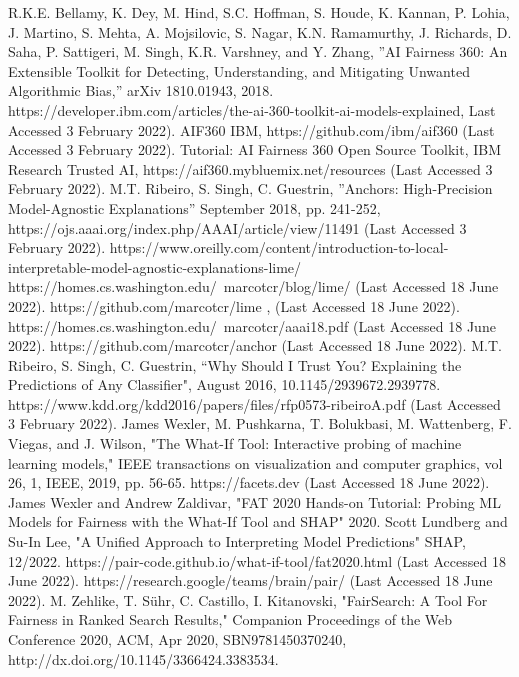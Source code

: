 \documentclass[conference]{IEEEtran}
\begin{document}
\begin{thebibliography}{00}
 R.K.E. Bellamy, K. Dey, M. Hind, S.C. Hoffman, S. Houde, K. Kannan, P. Lohia, J. Martino, S. Mehta, A. Mojsilovic, S. Nagar, K.N. Ramamurthy, J. Richards, D. Saha, P. Sattigeri, M. Singh, K.R. Varshney, and Y. Zhang, ''AI Fairness 360: An Extensible Toolkit for Detecting, Understanding, and Mitigating Unwanted Algorithmic Bias,'' arXiv 1810.01943, 2018.
 https://developer.ibm.com/articles/the-ai-360-toolkit-ai-models-explained, Last Accessed 3 February 2022).
 AIF360 IBM, https://github.com/ibm/aif360 (Last Accessed 3 February 2022).
 Tutorial: AI Fairness 360 Open Source Toolkit, IBM Research Trusted AI, https://aif360.mybluemix.net/resources (Last Accessed 3 February 2022).
 M.T. Ribeiro, S. Singh, C. Guestrin, ''Anchors: High-Precision Model-Agnostic Explanations'' September 2018, pp. 241-252, https://ojs.aaai.org/index.php/AAAI/article/view/11491 (Last Accessed 3 February 2022).
 https://www.oreilly.com/content/introduction-to-local-interpretable-model-agnostic-explanations-lime/
 https://homes.cs.washington.edu/~marcotcr/blog/lime/ (Last Accessed 18 June 2022).
 https://github.com/marcotcr/lime , (Last Accessed 18 June 2022).
 https://homes.cs.washington.edu/~marcotcr/aaai18.pdf (Last Accessed 18 June 2022).
 https://github.com/marcotcr/anchor (Last Accessed 18 June 2022).
 M.T. Ribeiro, S. Singh, C. Guestrin, “Why Should I Trust You? Explaining the Predictions of Any Classifier", August 2016, 10.1145/2939672.2939778.
 https://www.kdd.org/kdd2016/papers/files/rfp0573-ribeiroA.pdf (Last Accessed 3 February 2022).
 James Wexler, M. Pushkarna, T. Bolukbasi, M. Wattenberg, F. Viegas, and J. Wilson, "The What-If Tool: Interactive probing of machine learning models," IEEE transactions on visualization and computer graphics, vol 26, 1, IEEE, 2019, pp. 56-65.
 https://facets.dev (Last Accessed 18 June 2022).
 James Wexler and Andrew Zaldivar, "FAT 2020 Hands-on Tutorial: Probing ML Models for Fairness with the What-If Tool and SHAP" 2020.
 Scott Lundberg and Su-In Lee, "A Unified Approach to Interpreting Model Predictions" SHAP, 12/2022.
 https://pair-code.github.io/what-if-tool/fat2020.html (Last Accessed 18 June 2022).
 https://research.google/teams/brain/pair/ (Last Accessed 18 June 2022).
 M. Zehlike, T. Sühr, C. Castillo, I. Kitanovski, "FairSearch: A Tool For Fairness in Ranked Search Results," Companion Proceedings of the Web Conference 2020, ACM, Apr 2020, SBN9781450370240, http://dx.doi.org/10.1145/3366424.3383534.

\end{thebibliography}
\end{document}
